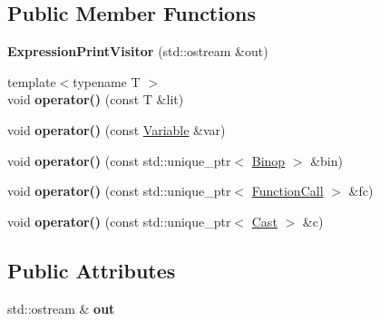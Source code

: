 \subsection*{Public Member Functions}
\begin{DoxyCompactItemize}
\item 
\hypertarget{struct_craeft_1_1_a_s_t_1_1_expression_print_visitor_a4748b28753ef931037b4c9b3e34c0055}{}\label{struct_craeft_1_1_a_s_t_1_1_expression_print_visitor_a4748b28753ef931037b4c9b3e34c0055} 
{\bfseries Expression\+Print\+Visitor} (std\+::ostream \&out)
\item 
\hypertarget{struct_craeft_1_1_a_s_t_1_1_expression_print_visitor_acbd09f31d916d91ba63dc952cf4722ba}{}\label{struct_craeft_1_1_a_s_t_1_1_expression_print_visitor_acbd09f31d916d91ba63dc952cf4722ba} 
{\footnotesize template$<$typename T $>$ }\\void {\bfseries operator()} (const T \&lit)
\item 
\hypertarget{struct_craeft_1_1_a_s_t_1_1_expression_print_visitor_aeb2d0eb54931d3f73037083de8cafbe4}{}\label{struct_craeft_1_1_a_s_t_1_1_expression_print_visitor_aeb2d0eb54931d3f73037083de8cafbe4} 
void {\bfseries operator()} (const \hyperlink{struct_craeft_1_1_a_s_t_1_1_variable}{Variable} \&var)
\item 
\hypertarget{struct_craeft_1_1_a_s_t_1_1_expression_print_visitor_a8dc5fecbb36ab796a8a5aafea15f9df2}{}\label{struct_craeft_1_1_a_s_t_1_1_expression_print_visitor_a8dc5fecbb36ab796a8a5aafea15f9df2} 
void {\bfseries operator()} (const std\+::unique\+\_\+ptr$<$ \hyperlink{struct_craeft_1_1_a_s_t_1_1_binop}{Binop} $>$ \&bin)
\item 
\hypertarget{struct_craeft_1_1_a_s_t_1_1_expression_print_visitor_abaaf0952418ae731e17df5267d413e73}{}\label{struct_craeft_1_1_a_s_t_1_1_expression_print_visitor_abaaf0952418ae731e17df5267d413e73} 
void {\bfseries operator()} (const std\+::unique\+\_\+ptr$<$ \hyperlink{struct_craeft_1_1_a_s_t_1_1_function_call}{Function\+Call} $>$ \&fc)
\item 
\hypertarget{struct_craeft_1_1_a_s_t_1_1_expression_print_visitor_affc09118165703f172b92b7a5c33355c}{}\label{struct_craeft_1_1_a_s_t_1_1_expression_print_visitor_affc09118165703f172b92b7a5c33355c} 
void {\bfseries operator()} (const std\+::unique\+\_\+ptr$<$ \hyperlink{struct_craeft_1_1_a_s_t_1_1_cast}{Cast} $>$ \&c)
\end{DoxyCompactItemize}
\subsection*{Public Attributes}
\begin{DoxyCompactItemize}
\item 
\hypertarget{struct_craeft_1_1_a_s_t_1_1_expression_print_visitor_a604b7caef0b71da99a6d8eb3a58a3957}{}\label{struct_craeft_1_1_a_s_t_1_1_expression_print_visitor_a604b7caef0b71da99a6d8eb3a58a3957} 
std\+::ostream \& {\bfseries out}
\end{DoxyCompactItemize}


